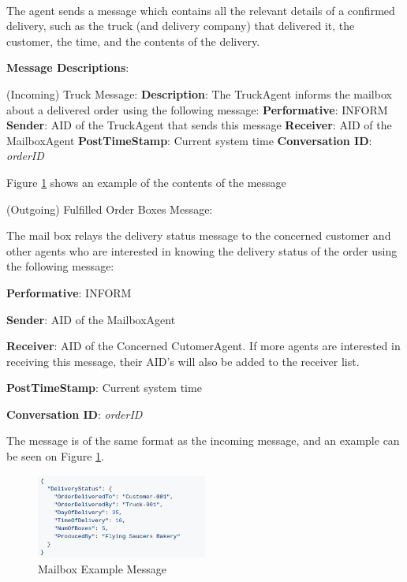 \documentclass[11pt, a4paper]{article}
\begin{document}
\paragraph{}
The agent sends a message which contains all the relevant details of a confirmed delivery, such as the truck (and delivery company) that delivered it, the customer, the time, and the contents of the delivery.

\hfill\break
\textbf{Message Descriptions}:

\hfill\break
(Incoming) Truck Message:
\hfill\break
\textbf{Description}:
The TruckAgent informs the mailbox about a delivered order using the following message:
\hfill\break
\textbf{Performative}: INFORM
\hfill\break
\textbf{Sender}: AID of the TruckAgent that sends this message
\hfill\break
\textbf{Receiver}: AID of the MailboxAgent
\hfill\break
\textbf{PostTimeStamp}: Current system time
\hfill\break
\textbf{Conversation ID}: \textit{orderID}

\hfill\break
Figure \ref{mailboxmsgexample} shows an example of the contents of the message
	
(Outgoing) Fulfilled Order Boxes Message:
	
The mail box relays the delivery status message to the concerned customer and other agents who are interested in knowing the delivery status of the order using the following message:
	
\textbf{Performative}: INFORM
	
\textbf{Sender}: AID of the MailboxAgent
	
\textbf{Receiver}: AID of the Concerned CutomerAgent. If more agents are interested in receiving this message, their AID's will also be added to the receiver list.
	
\textbf{PostTimeStamp}: Current system time
	
\textbf{Conversation ID}: \textit{orderID}
	
The message is of the same format as the incoming message, and an example can be seen on Figure \ref{mailboxmsgexample}.

	\begin{figure}[h!]
		\centering
		\includegraphics[width=0.5\textwidth]{../images/mailboxmsgexample.png}
		\caption{Mailbox Example Message}
		\label{mailboxmsgexample}
	\end{figure}
\end{document}
